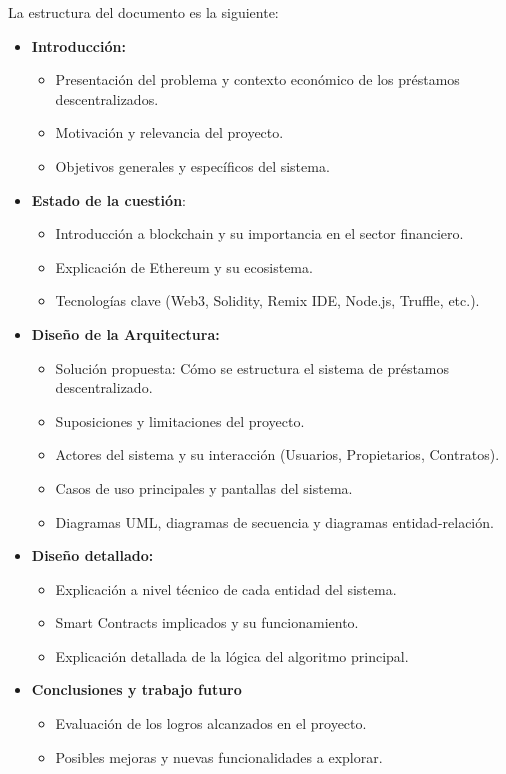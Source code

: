 La estructura del documento es la siguiente:
\begin{itemize}
    \item \textbf{Introducción:}
    \begin{itemize}
        \item Presentación del problema y contexto económico de los préstamos descentralizados.
        \item Motivación y relevancia del proyecto.
        \item Objetivos generales y específicos del sistema.
    \end{itemize}
    \item \textbf{Estado de la cuestión}:
        \begin{itemize}
        \item Introducción a blockchain y su importancia en el sector financiero.
        \item Explicación de Ethereum y su ecosistema.
        \item Tecnologías clave (Web3, Solidity, Remix IDE, Node.js, Truffle, etc.).
    \end{itemize}
    \item \textbf{Diseño de la Arquitectura:}
        \begin{itemize}
        \item Solución propuesta: Cómo se estructura el sistema de préstamos descentralizado.
        \item Suposiciones y limitaciones del proyecto.
        \item Actores del sistema y su interacción (Usuarios, Propietarios, Contratos).
        \item Casos de uso principales y pantallas del sistema.
        \item Diagramas UML, diagramas de secuencia y diagramas entidad-relación.
    \end{itemize}
    \item \textbf{Diseño detallado:}
            \begin{itemize}
        \item Explicación a nivel técnico de cada entidad del sistema.
        \item Smart Contracts implicados y su funcionamiento.
        \item Explicación detallada de la lógica del algoritmo principal.
    \end{itemize}
    \item \textbf{Conclusiones y trabajo futuro}
            \begin{itemize}
        \item Evaluación de los logros alcanzados en el proyecto.
        \item Posibles mejoras y nuevas funcionalidades a explorar.
    \end{itemize}
    
\end{itemize}

